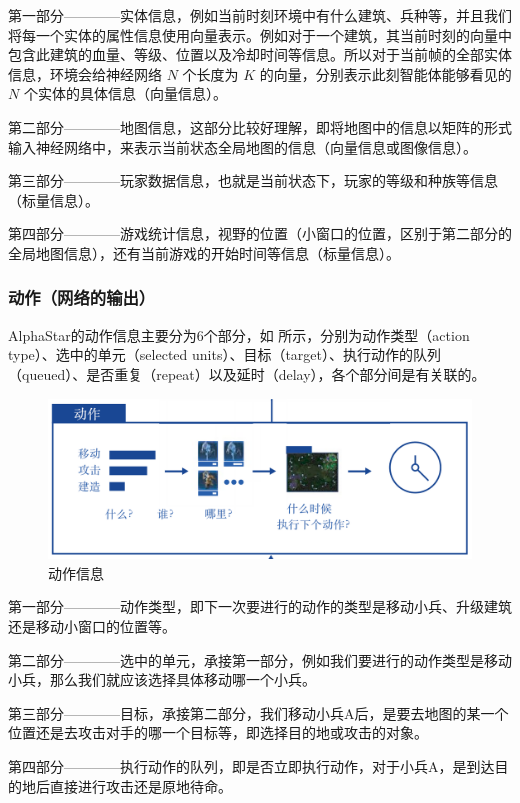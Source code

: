 第一部分————实体信息，例如当前时刻环境中有什么建筑、兵种等，并且我们将每一个实体的属性信息使用向量表示。例如对于一个建筑，其当前时刻的向量中包含此建筑的血量、等级、位置以及冷却时间等信息。所以对于当前帧的全部实体信息，环境会给神经网络 $N$ 个长度为 $K$ 的向量，分别表示此刻智能体能够看见的 $N$ 个实体的具体信息（向量信息）。

第二部分————地图信息，这部分比较好理解，即将地图中的信息以矩阵的形式输入神经网络中，来表示当前状态全局地图的信息（向量信息或图像信息）。

第三部分————玩家数据信息，也就是当前状态下，玩家的等级和种族等信息（标量信息）。

第四部分————游戏统计信息，视野的位置（小窗口的位置，区别于第二部分的全局地图信息），还有当前游戏的开始时间等信息（标量信息）。

\subsubsection{动作（网络的输出）} 

AlphaStar的动作信息主要分为6个部分，如 所示，分别为动作类型（action type）、选中的单元（selected units）、目标（target）、执行动作的队列（queued）、是否重复（repeat）以及延时（delay），各个部分间是有关联的。


\begin{figure}[htb]
    \centering
    \includegraphics[width=0.7\linewidth]{res/ch13/13.2}
    \caption{动作信息}
    \label{fig:13_2}
\end{figure}

第一部分————动作类型，即下一次要进行的动作的类型是移动小兵、升级建筑还是移动小窗口的位置等。

第二部分————选中的单元，承接第一部分，例如我们要进行的动作类型是移动小兵，那么我们就应该选择具体移动哪一个小兵。

第三部分————目标，承接第二部分，我们移动小兵A后，是要去地图的某一个位置还是去攻击对手的哪一个目标等，即选择目的地或攻击的对象。

第四部分————执行动作的队列，即是否立即执行动作，对于小兵A，是到达目的地后直接进行攻击还是原地待命。

